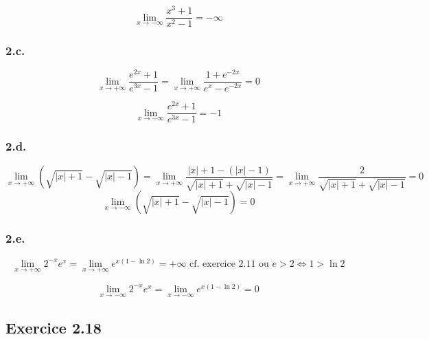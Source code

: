 \documentclass[a4paper,10pt]{report}
\begin{document}
\begin{displaymath}
	\lim_{x \rightarrow -\infty} \frac{x^3+1}{x^2-1} = -\infty
\end{displaymath}

\subsubsection*{2.c.}
\begin{displaymath}
	\lim_{x \rightarrow +\infty} \frac{e^{2x}+1}{e^{3x}-1} = \lim_{x \rightarrow +\infty} \frac{1+ e^{-2x}}{e^{x}-e^{-2x}} = 0
\end{displaymath}

\begin{displaymath}
	\lim_{x \rightarrow -\infty} \frac{e^{2x}+1}{e^{3x}-1} = -1
\end{displaymath}


\subsubsection*{2.d.}
\begin{displaymath}
	\lim_{x \rightarrow +\infty} \left( \sqrt{|x|+1} - \sqrt{|x|-1} \right)
		= \lim_{x \rightarrow +\infty} \frac{|x|+1-(|x|-1)}{\sqrt{|x|+1} + \sqrt{|x|-1}} = \lim_{x \rightarrow +\infty} \frac{2}{\sqrt{|x|+1} + \sqrt{|x|-1}} = 0
\end{displaymath}
\begin{displaymath}
	\lim_{x \rightarrow -\infty} \left( \sqrt{|x|+1} - \sqrt{|x|-1} \right) = 0
\end{displaymath}

\subsubsection*{2.e.}
\begin{displaymath}
	\lim_{x \rightarrow +\infty} 2^{-x}e^x = \lim_{x \rightarrow +\infty} e^{x(1-\ln 2)} = +\infty \text{ cf. exercice 2.11 ou } e>2 \Longleftrightarrow 1 > \ln 2
\end{displaymath}

\begin{displaymath}
	\lim_{x \rightarrow -\infty} 2^{-x}e^x = \lim_{x \rightarrow -\infty} e^{x(1-\ln 2)} = 0^{}
\end{displaymath}


\subsection*{Exercice 2.18}
\end{document}
